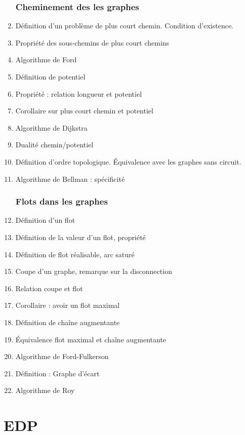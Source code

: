 \documentclass[11pt, twocolumn, landscape]{article}
\begin{document}
\begin{enumerate}
\section{Cheminement des les graphes}
	\item Définition d'un problème de plus court chemin. Condition d'existence.
	\item Propriété des sous-chemins de plus court chemins
	\item Algorithme de Ford
	\item Définition de potentiel
	\item Propriété : relation longueur et potentiel
	\item Corollaire sur plus court chemin et potentiel
	\item Algorithme de Dijkstra
	\item Dualité chemin/potentiel
	\item Définition d'ordre topologique. Équivalence avec les graphes sans circuit.
	\item Algorithme de Bellman : spécificité
\section{Flots dans les graphes}
	\item Définition d'un flot
	\item Définition de la valeur d'un flot, propriété
	\item Définition de flot réalisable, arc saturé
	\item Coupe d'un graphe, remarque sur la disconnection
	\item Relation coupe et flot
	\item Corollaire : avoir un flot maximal
	\item Définition de chaîne augmentante
	\item Équivalence flot maximal et chaîne augmentante
	\item Algorithme de Ford-Fulkerson
	\item Définition : Graphe d'écart
	\item Algorithme de Roy
\end{enumerate}

\part{EDP}
\end{document}
